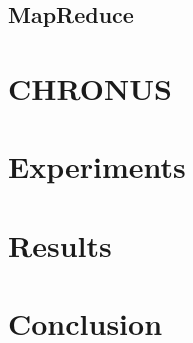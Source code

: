 \documentclass[10pt, conference, compsocconf, letterpaper]{IEEEtran}
\begin{document}
\subsection{MapReduce}

\section{CHRONUS}


\section{Experiments}

\section{Results}

\section{Conclusion}



\end{document}
